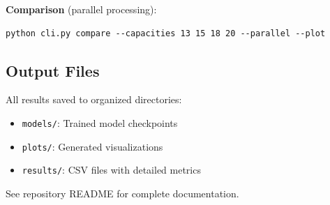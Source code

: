 \documentclass[11pt,a4paper]{article}
\begin{document}
\textbf{Comparison} (parallel processing):
\begin{verbatim}
python cli.py compare --capacities 13 15 18 20 --parallel --plot
\end{verbatim}

\subsection{Output Files}

All results saved to organized directories:
\begin{itemize}
    \item \texttt{models/}: Trained model checkpoints
    \item \texttt{plots/}: Generated visualizations
    \item \texttt{results/}: CSV files with detailed metrics
\end{itemize}

See repository README for complete documentation.
\end{document}
